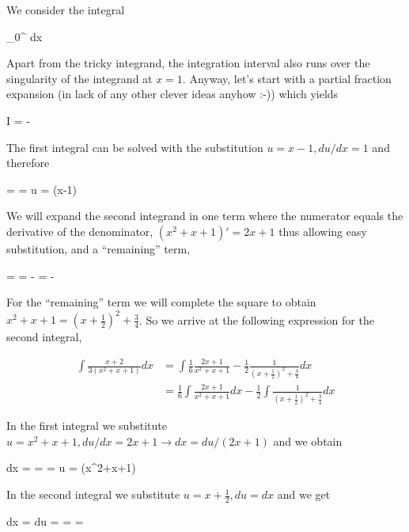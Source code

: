 
We consider the integral

\bee
\int_0^\infty {} dx
\eee

Apart from the tricky integrand, the integration interval also runs over the singularity of the integrand at $x=1$. Anyway, let's start with a partial fraction expansion (in lack of any other clever ideas anyhow :-)) which yields

\bee
I = \int {} - 
\eee

The first integral can be solved with the substitution $u = x-1, du/dx = 1$ and therefore

\bee
\int{} =  \int {} =  \ln u =  \ln (x-1)
\eee

We will expand the second integrand in one term where the numerator equals the derivative of the denominator, $(x^2+x+1)' = 2x+1$ thus allowing easy substitution, and a ``remaining'' term,

\bee
{} =    =   -  =   - 
\eee

For the ``remaining'' term we will complete the square to obtain $x^2+x+1 = (x+\frac{1}{2})^2 + \frac{3}{4}$. So we arrive at the following expression for the second integral,

\begin{align*}
  \int \frac{x+2}{3(x^2+x+1)} dx &= \int \frac{1}{6} \frac{2x+1}{x^2+x+1} - \frac{1}{2}\frac{1}{(x+\frac{1}{2})^2 + \frac{3}{4}} dx\\
  &= \frac{1}{6} \int \frac{2x+1}{x^2+x+1} dx - \frac{1}{2} \int \frac{1}{(x+\frac{1}{2})^2 + \frac{3}{4}} dx
\end{align*}

In the first integral we substitute $u = x^2+x+1, du/dx = 2x+1 \rightarrow dx = du/(2x+1)$ and we obtain

\bee
{} \int {} dx =  \int {} =  \int {} =  \ln u =  \ln (x^2+x+1)
\eee

In the second integral we substitute $u = x + \frac{1}{2}, du=dx$ and we get

\bee
{} \int {} dx =  \int {} du =  \arctan {} =  \arctan {} =  \arctan {}
\eee


